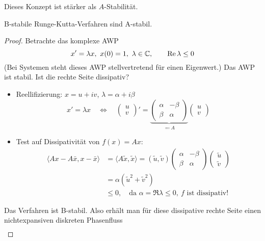 Dieses Konzept ist stärker als $A$-Stabilität.

\begin{lemma}
	B-stabile Runge-Kutta-Verfahren sind A-stabil.
\end{lemma}
\begin{proof}
	Betrachte das komplexe AWP
	\begin{equation*}
		x'=\lambda x,\ x(0)=1,\ \lambda\in\mathbb C,
		\qquad
		\operatorname{Re} \lambda \leq 0
	\end{equation*}
	(Bei Systemen steht dieses AWP stellvertretend für einen Eigenwert.)
	Das AWP ist stabil. Ist die rechte Seite dissipativ?
	\begin{itemize}
		\item Reellifizierung: $x=u+iv$, $\lambda=\alpha+i\beta$
		\begin{equation*}
			x' = \lambda x\quad\Leftrightarrow\quad \begin{pmatrix}
			u \\ v
			\end{pmatrix}' = \underbrace{\begin{pmatrix}
			\alpha & -\beta \\ \beta & \alpha
			\end{pmatrix}}_{\eqqcolon A}\begin{pmatrix}
			u \\ v
			\end{pmatrix}
		\end{equation*}
		\item Test auf Dissipativität von $f(x) = Ax$:
		\begin{align*}
			\langle Ax-A\bar x, x-\bar x\rangle &= \langle A\tilde x, \tilde x\rangle = (\tilde u,\tilde v) \begin{pmatrix} \alpha & -\beta \\ \beta & \alpha \end{pmatrix} \begin{pmatrix}
			\tilde u \\ \tilde v
			\end{pmatrix} \\
			&= \alpha(\tilde u^2+\tilde v^2) \\
			& \leq 0,\quad \text{da } \alpha=\Re\lambda \leq 0,\ f\text{ ist dissipativ!}
		\end{align*}
	\end{itemize}
	Das Verfahren ist B-stabil. Also erhält man für diese dissipative rechte Seite einen nichtexpansiven diskreten Phasenfluss
	\begin{align*}

\end{align*}
\end{proof}
